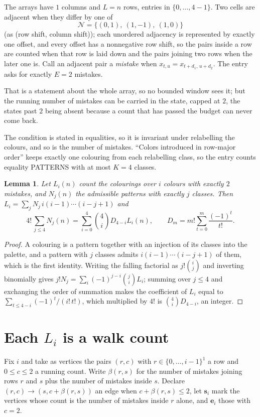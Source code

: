 \documentclass[11pt,a4paper]{article}
\theoremstyle{plain}
\newtheorem{lemma}[theorem]{Lemma}
\theoremstyle{definition}
\begin{document}
The arrays have $1$ columns and $L=n$ rows, entries in $\{0,\dots,4-1\}$.
Two cells are adjacent when they differ by one of
\[
\mathcal N=\{(0,1),\ (1,-1),\ (1,0)\}
\]
(as (row shift, column shift)); each unordered adjacency is represented by exactly one
offset, and every offset has a nonnegative row shift, so the pairs inside a row are
counted when that row is laid down and the pairs joining two rows when the later one
is. Call an adjacent pair a \emph{mistake} when $x_{t,u}=x_{t+d_1,\,u+d_2}$. The entry asks for exactly
$E=2$ mistakes.

That is a statement about the whole array, so no bounded window sees it; but the running
number of mistakes can be carried in the state, capped at $2$, the states past $2$ being
absent because a count that has passed the budget can never come back.

The condition is stated in equalities, so it is invariant under relabelling the colours, and
so is the number of mistakes. ``Colors introduced in row-major order'' keeps exactly one
colouring from each relabelling class, so the entry counts equality PATTERNS with at most
$K=4$ classes.

\begin{lemma}\label{lem:inv}
Let $L_i(n)$ count the colourings over $i$ colours with exactly $2$ mistakes, and $N_j(n)$
the admissible patterns with exactly $j$ classes. Then
$L_i=\sum_j N_j\,i(i-1)\cdots(i-j+1)$ and
\[
4!\,\sum_{j\le4}N_j(n)=\sum_{i=0}^{4}\binom{4}{i}D_{4-i}L_i(n),
\qquad D_m=m!\sum_{t=0}^{m}\frac{(-1)^t}{t!} .
\]
\end{lemma}

\begin{proof}
A colouring is a pattern together with an injection of its classes into the palette, and a
pattern with $j$ classes admits $i(i-1)\cdots(i-j+1)$ of them, which is the first identity.
Writing the falling factorial as $j!\binom{i}{j}$ and inverting binomially gives
$j!N_j=\sum_i(-1)^{j-i}\binom{j}{i}L_i$; summing over $j\le4$ and exchanging the order
of summation makes the coefficient of $L_i$ equal to $\sum_{t\le4-i}(-1)^t/(i!\,t!)$,
which multiplied by $4!$ is $\binom{4}{i}D_{4-i}$, an integer.
\end{proof}

\section{Each $L_i$ is a walk count}

Fix $i$ and take as vertices the pairs $(r,c)$ with $r\in\{0,\dots,i-1\}^{1}$ a row
and $0\le c\le2$ a running count. Write $\beta(r,s)$ for the number of mistakes joining
rows $r$ and $s$ plus the number of mistakes inside $s$. Declare $(r,c)\to(s,c+\beta(r,s))$
an edge when $c+\beta(r,s)\le2$, let $\mathbf{s}_i$ mark the vertices whose count is the
number of mistakes inside $r$ alone, and $\mathbf{e}_i$ those with $c=2$.
\end{document}
